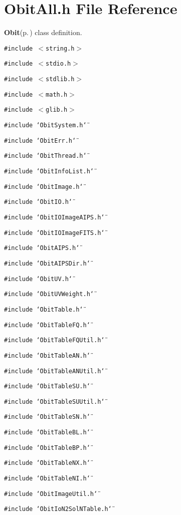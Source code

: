 \section{Obit\-All.h File Reference}
\label{ObitAll_8h}
{\bf Obit}{\rm (p.\,\pageref{structObit})} class definition. 

{\tt \#include $<$string.h$>$}\par
{\tt \#include $<$stdio.h$>$}\par
{\tt \#include $<$stdlib.h$>$}\par
{\tt \#include $<$math.h$>$}\par
{\tt \#include $<$glib.h$>$}\par
{\tt \#include \char`\"{}Obit\-System.h\char`\"{}}\par
{\tt \#include \char`\"{}Obit\-Err.h\char`\"{}}\par
{\tt \#include \char`\"{}Obit\-Thread.h\char`\"{}}\par
{\tt \#include \char`\"{}Obit\-Info\-List.h\char`\"{}}\par
{\tt \#include \char`\"{}Obit\-Image.h\char`\"{}}\par
{\tt \#include \char`\"{}Obit\-IO.h\char`\"{}}\par
{\tt \#include \char`\"{}Obit\-IOImage\-AIPS.h\char`\"{}}\par
{\tt \#include \char`\"{}Obit\-IOImage\-FITS.h\char`\"{}}\par
{\tt \#include \char`\"{}Obit\-AIPS.h\char`\"{}}\par
{\tt \#include \char`\"{}Obit\-AIPSDir.h\char`\"{}}\par
{\tt \#include \char`\"{}Obit\-UV.h\char`\"{}}\par
{\tt \#include \char`\"{}Obit\-UVWeight.h\char`\"{}}\par
{\tt \#include \char`\"{}Obit\-Table.h\char`\"{}}\par
{\tt \#include \char`\"{}Obit\-Table\-FQ.h\char`\"{}}\par
{\tt \#include \char`\"{}Obit\-Table\-FQUtil.h\char`\"{}}\par
{\tt \#include \char`\"{}Obit\-Table\-AN.h\char`\"{}}\par
{\tt \#include \char`\"{}Obit\-Table\-ANUtil.h\char`\"{}}\par
{\tt \#include \char`\"{}Obit\-Table\-SU.h\char`\"{}}\par
{\tt \#include \char`\"{}Obit\-Table\-SUUtil.h\char`\"{}}\par
{\tt \#include \char`\"{}Obit\-Table\-SN.h\char`\"{}}\par
{\tt \#include \char`\"{}Obit\-Table\-BL.h\char`\"{}}\par
{\tt \#include \char`\"{}Obit\-Table\-BP.h\char`\"{}}\par
{\tt \#include \char`\"{}Obit\-Table\-NX.h\char`\"{}}\par
{\tt \#include \char`\"{}Obit\-Table\-NI.h\char`\"{}}\par
{\tt \#include \char`\"{}Obit\-Image\-Util.h\char`\"{}}\par
{\tt \#include \char`\"{}Obit\-Io\-N2Sol\-NTable.h\char`\"{}}\par


